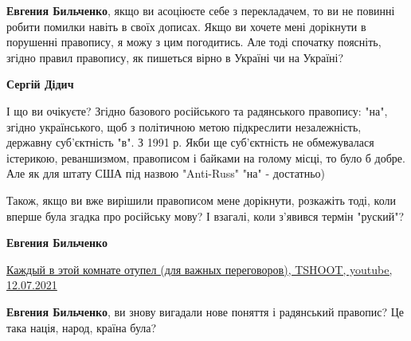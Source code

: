 \begin{itemize}
\begin{itemize}
\textbf{Евгения Бильченко}, якщо ви асоціюєте себе з перекладачем, то ви не повинні робити помилки навіть в своїх дописах. Якщо ви хочете мені дорікнути в порушенні правопису, я можу з цим погодитись. Але тоді спочатку поясніть, згідно правил правопису, як пишеться вірно в Україні чи на Україні?

 
\textbf{Сергій Дідич} 

І що ви очікуєте? Згідно базового російського та радянського правопису: "на",
згідно українського, щоб з політичною метою підкреслити незалежність, державну
суб'єктність "в". З 1991 р. Якби ще суб'єктність не обмежувалася істерикою,
реваншизмом, правописом і байками на голому місці, то було б добре. Але як для
штату США під назвою "Anti-Russ" "на" - достатньо)


 

Також, якщо ви вже вирішили правописом мене дорікнути, розкажіть тоді, коли
вперше була згадка про російську мову? І взагалі, коли з'явився термін
"руский"?

 
\textbf{Евгения Бильченко}

\href{https://www.youtube.com/watch?v=KTITw8X2368}{%
Каждый в этой комнате отупел (для важных переговоров), TSHOOT, youtube, 12.07.2021%
}

 

\textbf{Евгения Бильченко}, ви знову вигадали нове поняття і радянський правопис? Це
така нація, народ, країна була?


\end{itemize}
\end{itemize}
